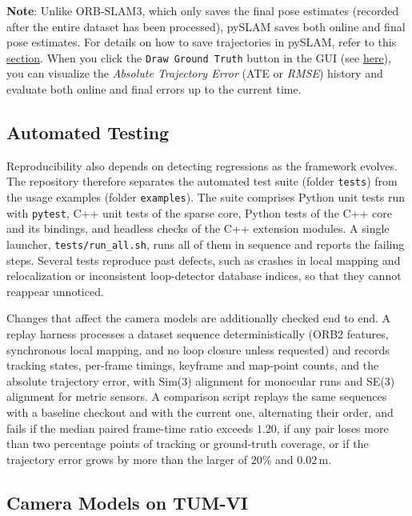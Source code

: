 \documentclass{article}
\begin{document}
\textbf{Note}: Unlike ORB-SLAM3, which only saves the final pose
estimates (recorded after the entire dataset has been processed), pySLAM
saves both online and final pose estimates. For details on how to save
trajectories in pySLAM, refer to this
\protect\hyperlink{trajectory-saving}{section}. When you click the
\texttt{Draw\ Ground\ Truth} button in the GUI (see
\protect\hyperlink{slam-gui}{here}), you can visualize the
\emph{Absolute Trajectory Error} (ATE or \emph{RMSE}) history and
evaluate both online and final errors up to the current time.

\hypertarget{testing}{%
\subsection{Automated Testing}\label{testing}}

Reproducibility also depends on detecting regressions as the framework evolves. The repository therefore separates the automated test suite (folder \texttt{tests}) from the usage examples (folder \texttt{examples}). The suite comprises Python unit tests run with \texttt{pytest}, C++ unit tests of the sparse core, Python tests of the C++ core and its bindings, and headless checks of the C++ extension modules. A single launcher, \texttt{tests/run\_all.sh}, runs all of them in sequence and reports the failing steps. Several tests reproduce past defects, such as crashes in local mapping and relocalization or inconsistent loop-detector database indices, so that they cannot reappear unnoticed.

Changes that affect the camera models are additionally checked end to end. A replay harness processes a dataset sequence deterministically (ORB2 features, synchronous local mapping, and no loop closure unless requested) and records tracking states, per-frame timings, keyframe and map-point counts, and the absolute trajectory error, with Sim(3) alignment for monocular runs and SE(3) alignment for metric sensors. A comparison script replays the same sequences with a baseline checkout and with the current one, alternating their order, and fails if the median paired frame-time ratio exceeds $1.20$, if any pair loses more than two percentage points of tracking or ground-truth coverage, or if the trajectory error grows by more than the larger of $20\%$ and $0.02$\,m.

\hypertarget{camera-model-validation}{%
\subsection{Camera Models on TUM-VI}\label{camera-model-validation}}
\end{document}
